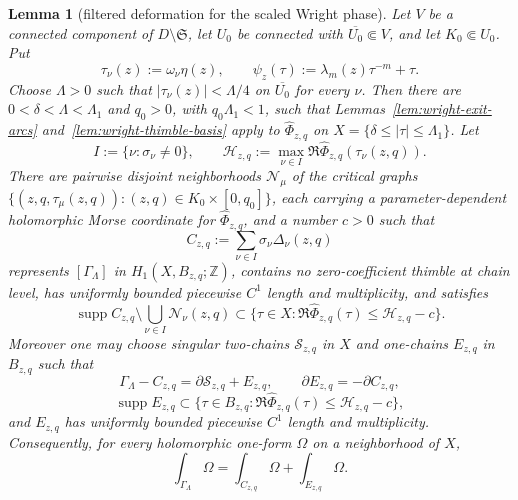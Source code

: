 \documentclass[10pt,a4paper]{amsart}
\newtheorem{lem}{Lemma}
\begin{document}
\begin{lem}[filtered deformation for the scaled Wright phase]\label{lem:filtered-wright}
Let $V$ be a connected component of $D\setminus\mathfrak S$, let $U_0$ be connected with $\overline{U_0}\Subset V$, and let $K_0\Subset U_0$. Put
$$\tau_\nu(z):=\omega_\nu\eta(z),\qquad \psi_z(\tau):=\lambda_m(z)\tau^{-m}+\tau.$$
Choose $\Lambda>0$ such that $|\tau_\nu(z)|<\Lambda/4$ on $\overline{U_0}$ for every $\nu$. Then there are $0<\delta<\Lambda<\Lambda_1$ and $q_0>0$, with $q_0\Lambda_1<1$, such that Lemmas~\ref{lem:wright-exit-arcs} and~\ref{lem:wright-thimble-basis} apply to $\widehat\Phi_{z,q}$ on $X=\{\delta\le |\tau|\le\Lambda_1\}$. Let
$$I:=\{\nu:\sigma_\nu\ne0\},\qquad
\mathcal H_{z,q}:=\max_{\nu\in I}\Re\widehat\Phi_{z,q}(\tau_\nu(z,q)).$$
There are pairwise disjoint neighborhoods $\mathcal N_\mu$ of the critical graphs $\{(z,q,\tau_\mu(z,q)):(z,q)\in K_0\times[0,q_0]\}$, each carrying a parameter-dependent holomorphic Morse coordinate for $\widehat\Phi_{z,q}$, and a number $c>0$ such that
$$C_{z,q}:=\sum_{\nu\in I}\sigma_\nu\Delta_\nu(z,q)$$
represents $[\Gamma_\Lambda]$ in $H_1(X,B_{z,q};\mathbb Z)$, contains no zero-coefficient thimble at chain level, has uniformly bounded piecewise $C^1$ length and multiplicity, and satisfies
$$\operatorname{supp}C_{z,q}\setminus\bigcup_{\nu\in I}\mathcal N_\nu(z,q)
\subset\{\tau\in X:\Re\widehat\Phi_{z,q}(\tau)\le\mathcal H_{z,q}-c\}.$$
Moreover one may choose singular two-chains $\mathcal S_{z,q}$ in $X$ and one-chains $E_{z,q}$ in $B_{z,q}$ such that
$$\Gamma_\Lambda-C_{z,q}=\partial\mathcal S_{z,q}+E_{z,q},\qquad
\partial E_{z,q}=-\partial C_{z,q},$$
$$\operatorname{supp}E_{z,q}\subset\{\tau\in B_{z,q}:\Re\widehat\Phi_{z,q}(\tau)\le\mathcal H_{z,q}-c\},$$
and $E_{z,q}$ has uniformly bounded piecewise $C^1$ length and multiplicity. Consequently, for every holomorphic one-form $\Omega$ on a neighborhood of $X$,
$$\int_{\Gamma_\Lambda}\Omega=\int_{C_{z,q}}\Omega+\int_{E_{z,q}}\Omega.$$
\end{lem}
\end{document}
